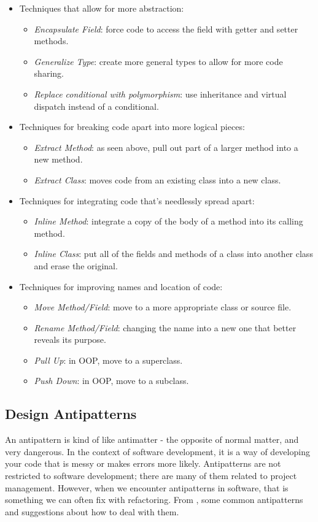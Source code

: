\begin{itemize}
\item Techniques that allow for more abstraction:
\begin{itemize}
\item \emph{Encapsulate Field}: force code to access the field with getter and setter methods.
\item \emph{Generalize Type}: create more general types to allow for more code sharing.
\item \emph{Replace conditional with polymorphism}: use inheritance and virtual dispatch instead of a conditional.
\end{itemize}
\item Techniques for breaking code apart into more logical pieces:
\begin{itemize}
\item \emph{Extract Method}: as seen above, pull out part of a larger method into a new method.
\item \emph{Extract Class}: moves code from an existing class into a new class.
\end{itemize}
\item Techniques for integrating code that's needlessly spread apart:
\begin{itemize}
\item \emph{Inline Method}: integrate a copy of the body of a method into its calling method.
\item \emph{Inline Class}: put all of the fields and methods of a class into another class and erase the original.
\end{itemize}
\item Techniques for improving names and location of code:
\begin{itemize}
\item \emph{Move Method/Field}: move to a more appropriate class or source file.
\item \emph{Rename Method/Field}: changing the name into a new one that better reveals its purpose.
\item \emph{Pull Up}: in OOP, move to a superclass.
\item \emph{Push Down}: in OOP, move to a subclass.
\end{itemize}
\end{itemize}

\subsection*{Design Antipatterns}
An antipattern is kind of like antimatter - the opposite of normal matter, and very dangerous. In the context of software development, it is a way of developing your code that is messy or makes errors more likely. Antipatterns are not restricted to software development; there are many of them related to project management. However, when we encounter antipatterns in software, that is something we can often fix with refactoring. From \cite{sourcemaking}, some common antipatterns and suggestions about how to deal with them.


